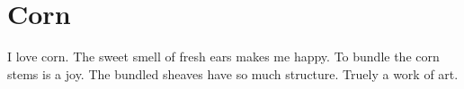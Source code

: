


\section{Corn}
I love corn. The sweet smell of fresh ears makes me happy. To bundle the corn stems is a joy. The bundled sheaves have so much structure. Truely a work of art.

